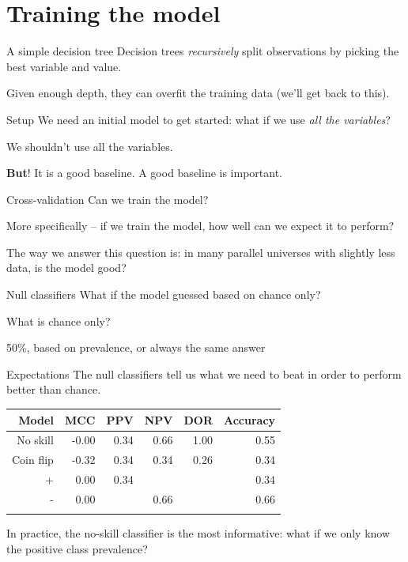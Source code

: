 \documentclass[12pt, smalloffset, compress, aspectratio=1610]{beamer}
\begin{document}
\section{Training the model}\label{training-the-model}

\begin{frame}{A simple decision tree}
\label{a-simple-decision-tree}
Decision trees \emph{recursively} split observations by picking the best
variable and value.

Given enough depth, they can \alert{overfit} the training data (we'll
get back to this).
\end{frame}

\begin{frame}{Setup}
\label{setup}
We need an \alert{initial} model to get started: what if we use
\emph{all the variables}?

We shouldn't use all the variables.

\textbf{But}! It is a good baseline. A good baseline is important.
\end{frame}

\begin{frame}{Cross-validation}
\label{cross-validation}
Can we train the model?

More specifically -- if we train the model, how well can we expect it to
perform?

The way we answer this question is: in many parallel universes with
slightly less data, is the model good?
\end{frame}

\begin{frame}{Null classifiers}
\label{null-classifiers}
What if the model guessed based on chance only?

What is \alert{chance only}?

50\%, based on prevalence, or always the same answer
\end{frame}

\begin{frame}{Expectations}
\label{expectations}
The null classifiers tell us what we need to beat in order to perform
\alert{better than
chance}.

\begin{longtable}[]{@{}rrrrrr@{}}
\toprule\noalign{}
\textbf{Model} & \textbf{MCC} & \textbf{PPV} & \textbf{NPV} &
\textbf{DOR} & \textbf{Accuracy} \\
\midrule\noalign{}
\endhead
No skill & -0.00 & 0.34 & 0.66 & 1.00 & 0.55 \\
Coin flip & -0.32 & 0.34 & 0.34 & 0.26 & 0.34 \\
+ & 0.00 & 0.34 & & & 0.34 \\
- & 0.00 & & 0.66 & & 0.66 \\
\bottomrule\noalign{}
\end{longtable}

In practice, the no-skill classifier is the most informative: what if we
\alert{only} know the positive class prevalence?
\end{frame}
\end{document}
